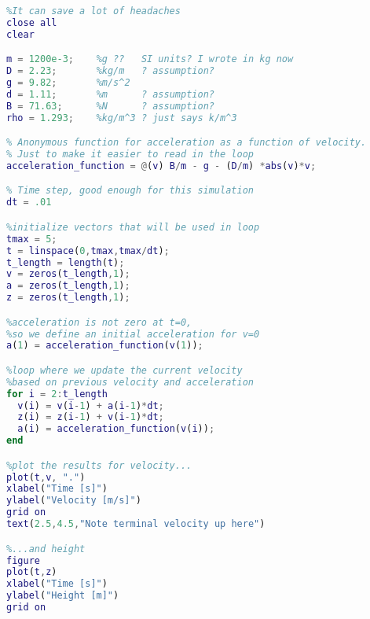 \documentclass{article}
\begin{document}
\newpage
\begin{lstlisting}[language = matlab]
%I usually close and clear at start of main script,
%It can save a lot of headaches
close all
clear

m = 1200e-3;    %g ??   SI units? I wrote in kg now
D = 2.23;       %kg/m   ? assumption?
g = 9.82;       %m/s^2
d = 1.11;       %m      ? assumption?
B = 71.63;      %N      ? assumption?
rho = 1.293;    %kg/m^3 ? just says k/m^3

% Anonymous function for acceleration as a function of velocity.
% Just to make it easier to read in the loop
acceleration_function = @(v) B/m - g - (D/m) *abs(v)*v;

% Time step, good enough for this simulation
dt = .01

%initialize vectors that will be used in loop
tmax = 5;
t = linspace(0,tmax,tmax/dt);
t_length = length(t);
v = zeros(t_length,1);
a = zeros(t_length,1);
z = zeros(t_length,1);

%acceleration is not zero at t=0,
%so we define an initial acceleration for v=0
a(1) = acceleration_function(v(1));

%loop where we update the current velocity
%based on previous velocity and acceleration
for i = 2:t_length
  v(i) = v(i-1) + a(i-1)*dt;
  z(i) = z(i-1) + v(i-1)*dt;
  a(i) = acceleration_function(v(i));
end

%plot the results for velocity...
plot(t,v, ".")
xlabel("Time [s]")
ylabel("Velocity [m/s]")
grid on
text(2.5,4.5,"Note terminal velocity up here")

%...and height
figure
plot(t,z)
xlabel("Time [s]")
ylabel("Height [m]")
grid on
\end{lstlisting}
\end{document}
